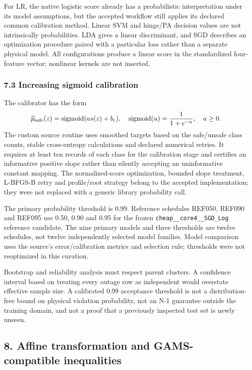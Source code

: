 \documentclass[
  11pt,
  a4paper,
]{article}
\begin{document}
For LR, the native logistic score already has a probabilistic
interpretation under its model assumptions, but the accepted workflow
still applies its declared common calibration method. Linear SVM and
hinge/PA decision values are not intrinsically probabilities. LDA gives
a linear discriminant, and SGD describes an optimization procedure
paired with a particular loss rather than a separate physical model. All
configurations produce a linear score in the standardized four-feature
vector; nonlinear kernels are not inserted.

\subsubsection{7.3 Increasing sigmoid
calibration}\label{increasing-sigmoid-calibration}

The calibrator has the form \[
\widehat p_{\rm safe}(z)=\operatorname{sigmoid}(a s(z)+b_c),\quad
\operatorname{sigmoid}(u)=\frac{1}{1+e^{-u}},\quad a\ge0.
\] The custom source routine uses smoothed targets based on the
safe/unsafe class counts, stable cross-entropy calculations and declared
numerical retries. It requires at least ten records of each class for
the calibration stage and certifies an informative positive slope rather
than silently accepting an uninformative constant mapping. The
normalized-score optimization, bounded slope treatment, L-BFGS-B retry
and profile/root strategy belong to the accepted implementation; they
were not replaced with a generic library probability call.

The primary probability threshold is 0.99. Reference schedules REF050,
REF090 and REF095 use 0.50, 0.90 and 0.95 for the frozen
\texttt{cheap\_\_core4\_\_SGD\_Log} reference candidate. The nine
primary models and three thresholds are twelve schedules, not twelve
independently selected model families. Model comparison uses the
source's error/calibration metrics and selection rule; thresholds were
not reoptimized in this curation.

Bootstrap and reliability analysis must respect parent clusters. A
confidence interval based on treating every outage row as independent
would overstate effective sample size. A calibrated 0.99 acceptance
threshold is not a distribution-free bound on physical violation
probability, not an N-1 guarantee outside the training domain, and not a
proof that a previously inspected test set is newly unseen.

\subsection{8. Affine transformation and GAMS-compatible
inequalities}\label{affine-transformation-and-gams-compatible-inequalities}
\end{document}
